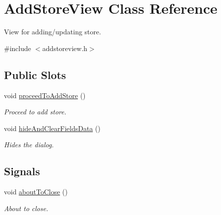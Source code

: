 \hypertarget{class_add_store_view}{\section{\-Add\-Store\-View \-Class \-Reference}
\label{class_add_store_view}
}


\-View for adding/updating store.  




{\ttfamily \#include $<$addstoreview.\-h$>$}

\subsection*{\-Public \-Slots}
\begin{DoxyCompactItemize}
\item 
void \hyperlink{class_add_store_view_a539fa7d561215af0fd9e84fd98e7367a}{proceed\-To\-Add\-Store} ()
\begin{DoxyCompactList}\small\item\em \-Proceed to add store. \end{DoxyCompactList}\item 
void \hyperlink{class_add_store_view_a9bd94dac6198a32d1d81c910165c8677}{hide\-And\-Clear\-Fields\-Data} ()
\begin{DoxyCompactList}\small\item\em \-Hides the dialog. \end{DoxyCompactList}\end{DoxyCompactItemize}
\subsection*{\-Signals}
\begin{DoxyCompactItemize}
\item 
void \hyperlink{class_add_store_view_a5d102f287751af3af288aed6a813b37e}{about\-To\-Close} ()
\begin{DoxyCompactList}\small\item\em \-About to close. \end{DoxyCompactList}\end{DoxyCompactItemize}
